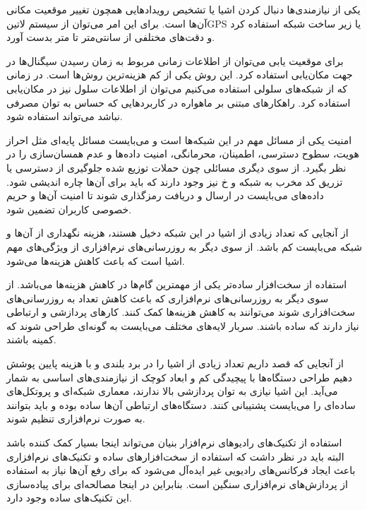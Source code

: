 
یکی از نیازمندی‌ها دنبال کردن اشیا یا تشخیص رویدادهایی همچون تغییر موقعیت مکانی آن‌ها است.
برای این امر می‌توان از سیستم ‌لاتین{GPS} یا زیر ساخت شبکه استفاده کرد و دقت‌های مختلفی
از سانتی‌متر تا متر بدست آورد.

برای موقعیت یابی می‌توان از اطلاعات زمانی مربوط به زمان رسیدن سیگنال‌ها در جهت مکان‌یابی استفاده کرد. این روش
یکی از کم هزینه‌ترین روش‌ها است. در زمانی که از شبکه‌های سلولی استفاده می‌کنیم می‌توان از اطلاعات سلول نیز
در مکان‌یابی استفاده کرد. راهکارهای مبتنی بر ماهواره در کاربردهایی که حساس به توان مصرفی نباشد می‌تواند استفاده شود.


امنیت یکی از مسائل مهم در این شبکه‌ها است و می‌بایست مسائل پایه‌ای
مثل احراز هویت، سطوح دسترسی، اطمینان، محرمانگی، امنیت داده‌ها و عدم همسان‌سازی را در نظر بگیرد.
از سوی دیگری مسائلی چون حملات توزیع شده جلوگیری از دسترسی یا تزریق کد مخرب به شبکه و ‌خ
نیز وجود دارند که باید برای آن‌ها چاره اندیشی شود.
داده‌های می‌بایست در ارسال و دریافت رمزگذاری شوند تا امنیت آن‌ها و حریم خصوصی کاربران تضمین شود.


از آنجایی که تعداد زیادی از اشیا در این شبکه دخیل هستند، هزینه نگهداری از آن‌ها و شبکه می‌بایست کم باشد.
از سوی دیگر به روزرسانی‌های نرم‌افزاری از ویژگی‌های مهم اشیا است که باعث کاهش هزینه‌ها می‌شود.

استفاده از سخت‌افزار ساده‌تر یکی از مهمترین گام‌ها در کاهش هزینه‌ها می‌باشد. از سوی دیگر به روزرسانی‌های
نرم‌افزاری که باعث کاهش تعداد به روزرسانی‌های سخت‌افزاری شوند می‌توانند به کاهش هزینه‌ها کمک کنند.
کارهای پردازشی و ارتباطی نیاز دارند که ساده باشند. سربار لایه‌های مختلف می‌بایست به گونه‌ای طراحی شوند
که کمینه باشند.


از آنجایی که قصد داریم تعداد زیادی از اشیا را در برد بلندی و با هزینه پایین پوشش دهیم طراحی دستگاه‌ها با پیچیدگی کم
و ابعاد کوچک از نیازمندی‌های اساسی به شمار می‌آید. این اشیا نیازی به توان پردازشی بالا ندارند، معماری شبکه‌ای و پروتکل‌های
ساده‌ای را می‌بایست پشتیبانی کنند. دستگاه‌های ارتباطی آن‌ها ساده بوده و باید بتوانند به صورت نرم‌افزاری تنظیم شوند.

استفاده از تکنیک‌های رادیوهای نرم‌افزار بنیان می‌تواند اینجا بسیار کمک کننده باشد
البته باید در نظر داشت که استفاده از سخت‌افزارهای ساده و تکنیک‌های نرم‌افزاری
باعث ایجاد فرکانس‌های رادیویی غیر ایده‌آل می‌شود که برای رفع آن‌ها نیاز به استفاده
از پردازش‌های نرم‌افزاری سنگین است. بنابراین در اینجا مصالحه‌ای برای پیاده‌سازی
این تکنیک‌های ساده وجود دارد.

